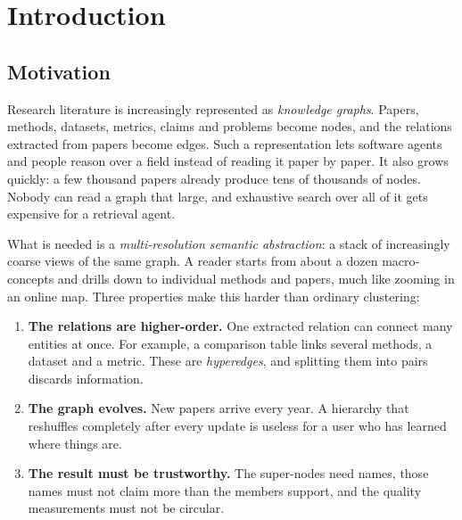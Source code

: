 \documentclass[11pt,a4paper]{article}
\theoremstyle{remark}
\begin{document}
\clearpage
\tableofcontents
\clearpage
\listoffigures
\listoftables
\listofalgorithms
\clearpage

\section{Introduction}
\label{sec:intro}

\subsection{Motivation}

Research literature is increasingly represented as \emph{knowledge graphs}.
Papers, methods, datasets, metrics, claims and problems become nodes, and the
relations extracted from papers become edges. Such a representation lets software
agents and people reason over a field instead of reading it paper by paper.
It also grows quickly: a few thousand papers already produce tens of thousands of
nodes. Nobody can read a graph that large, and exhaustive search over all of it
gets expensive for a retrieval agent.

What is needed is a \emph{multi-resolution semantic abstraction}: a stack of
increasingly coarse views of the same graph. A reader starts from about a dozen
macro-concepts and drills down to individual methods and papers, much like zooming
in an online map. Three properties make this harder than ordinary clustering:

\begin{enumerate}
  \item \textbf{The relations are higher-order.} One extracted relation can connect
        many entities at once. For example, a comparison table links several
        methods, a dataset and a metric. These are \emph{hyperedges}, and splitting
        them into pairs discards information.
  \item \textbf{The graph evolves.} New papers arrive every year. A hierarchy that
        reshuffles completely after every update is useless for a user who has
        learned where things are.
  \item \textbf{The result must be trustworthy.} The super-nodes need names, those
        names must not claim more than the members support, and the quality
        measurements must not be circular.
\end{enumerate}
\end{document}
